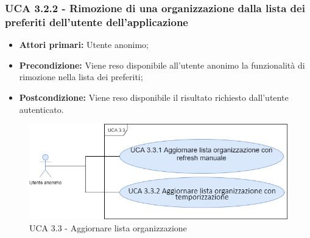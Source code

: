 \subsubsection{UCA 3.2.2 - Rimozione di una organizzazione dalla lista dei preferiti dell’utente dell’applicazione}%
\begin{itemize}
	\item \textbf{Attori primari:} Utente anonimo;
	\item \textbf{Precondizione:} Viene reso disponibile all’utente anonimo la funzionalità di rimozione nella lista dei preferiti;
	\item \textbf{Postcondizione:} Viene reso disponibile il risultato richiesto dall’utente autenticato.
\end{itemize}

\begin{figure}[h]
	\centering
	\caption{UCA 3.3 - Aggiornare lista organizzazione}
	\includegraphics[scale=0.5]{sezioni/UseCase/Immagini/UCA3.3.png}
\end{figure}

